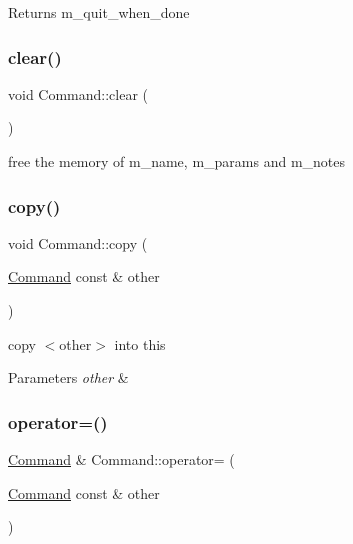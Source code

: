 \begin{DoxyReturn}{Returns}
m\+\_\+quit\+\_\+when\+\_\+done 
\end{DoxyReturn}
\mbox{\label{classCommand_a57fbea0c0d10ef4b184c7ef3eb34590d}} 
\subsubsection{\texorpdfstring{clear()}{clear()}}
{\footnotesize\ttfamily void Command\+::clear (\begin{DoxyParamCaption}{ }\end{DoxyParamCaption})\hspace{0.3cm}{\ttfamily [private]}}



free the memory of m\+\_\+name, m\+\_\+params and m\+\_\+notes 

\mbox{\label{classCommand_afc097ed76cb9fd7135146ec8703e2c3e}} 
\subsubsection{\texorpdfstring{copy()}{copy()}}
{\footnotesize\ttfamily void Command\+::copy (\begin{DoxyParamCaption}\item[{\hyperlink{classCommand}{Command} const \&}]{other }\end{DoxyParamCaption})\hspace{0.3cm}{\ttfamily [private]}}

copy $<$other$>$ into this 
\begin{DoxyParams}{Parameters}
{\em other} & \\
\hline
\end{DoxyParams}
\mbox{\label{classCommand_a378451c967b9d585492a778bab58f803}} 
\subsubsection{\texorpdfstring{operator=()}{operator=()}}
{\footnotesize\ttfamily \hyperlink{classCommand}{Command} \& Command\+::operator= (\begin{DoxyParamCaption}\item[{\hyperlink{classCommand}{Command} const \&}]{other }\end{DoxyParamCaption})}


